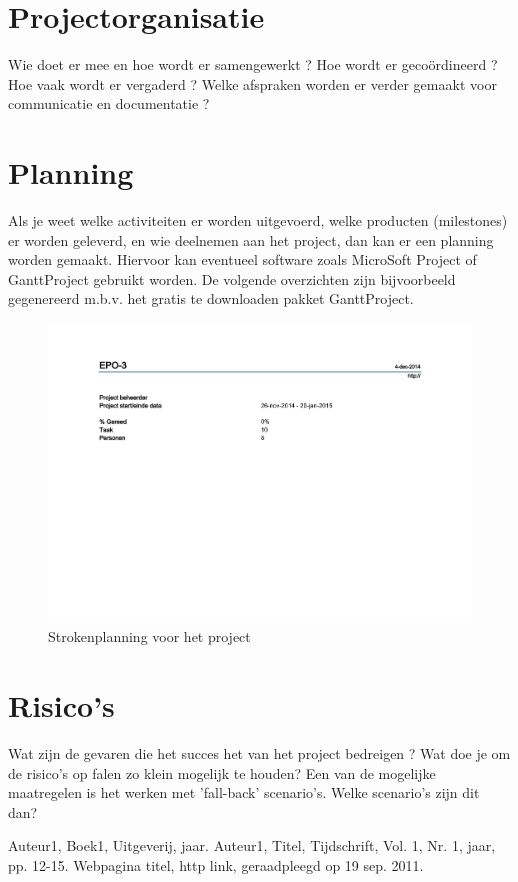 \documentclass[11pt,twoside,a4paper]{article}
\begin{document}
\section{Projectorganisatie}
Wie doet er mee en hoe wordt er samengewerkt ?  Hoe wordt er gecoördineerd ?  Hoe vaak wordt er vergaderd ?  Welke afspraken worden er verder gemaakt voor communicatie en documentatie ?
\section{Planning}
Als je weet welke activiteiten er worden uitgevoerd, welke producten (milestones) er worden geleverd, en wie deelnemen aan het project, dan kan er een planning worden gemaakt. Hiervoor kan eventueel software zoals MicroSoft Project of GanttProject gebruikt worden.  De volgende overzichten zijn bijvoorbeeld gegenereerd m.b.v. het gratis te downloaden pakket GanttProject.

\begin{figure}[h!]
\includegraphics[width=\textwidth,height=\textheight,keepaspectratio,page=4]{planning}
\caption{Strokenplanning voor het project}
\label{strokenplan}
\end{figure}

\section{Risico's}
Wat zijn de gevaren die het succes het van het project bedreigen ? Wat doe je om de risico's op falen zo klein mogelijk te houden? Een van de mogelijke maatregelen is het werken met 'fall-back' scenario’s. Welke scenario's zijn dit dan?


\begin{thebibliography}{9}
Auteur1, 
Boek1, 
Uitgeverij, 
jaar.
Auteur1, 
Titel, 
Tijdschrift, 
Vol. 1, 
Nr. 1, 
jaar, 
pp. 12-15.
Webpagina titel, 
http link, 
geraadpleegd op 19 sep. 2011.
\end{thebibliography}
\end{document}
